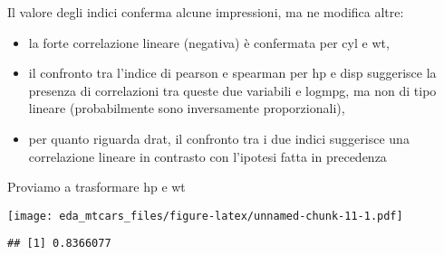 \documentclass[
]{article}
\newenvironment{Shaded}{\begin{snugshade}}{\end{snugshade}}
\newcommand{\AttributeTok}[1]{\textcolor[rgb]{0.77,0.63,0.00}{#1}}
\newcommand{\DecValTok}[1]{\textcolor[rgb]{0.00,0.00,0.81}{#1}}
\newcommand{\FunctionTok}[1]{\textcolor[rgb]{0.00,0.00,0.00}{#1}}
\newcommand{\NormalTok}[1]{#1}
\newcommand{\SpecialCharTok}[1]{\textcolor[rgb]{0.00,0.00,0.00}{#1}}
\newcommand{\StringTok}[1]{\textcolor[rgb]{0.31,0.60,0.02}{#1}}
\begin{document}
Il valore degli indici conferma alcune impressioni, ma ne modifica
altre:

\begin{itemize}
\item
  la forte correlazione lineare (negativa) è confermata per cyl e wt,
\item
  il confronto tra l'indice di pearson e spearman per hp e disp
  suggerisce la presenza di correlazioni tra queste due variabili e
  logmpg, ma non di tipo lineare (probabilmente sono inversamente
  proporzionali),
\item
  per quanto riguarda drat, il confronto tra i due indici suggerisce una
  correlazione lineare in contrasto con l'ipotesi fatta in precedenza
\end{itemize}

Proviamo a trasformare hp e wt

\begin{Shaded}
\end{Shaded}

\texttt{[image: eda\_mtcars\_files/figure-latex/unnamed-chunk-11-1.pdf]}

\begin{Shaded}
\end{Shaded}

\begin{verbatim}
## [1] 0.8366077
\end{verbatim}

\begin{Shaded}
\end{Shaded}
\end{document}
